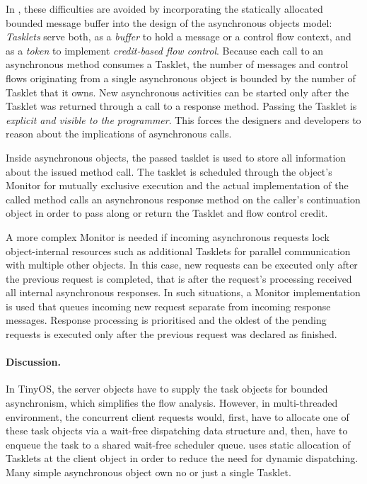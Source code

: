 In \mythos, these difficulties are avoided by incorporating the statically allocated bounded message buffer into the design of the asynchronous objects model:
\hspace{0px}
\emph{Tasklets} serve both, as a \emph{buffer} to hold a message or a control flow context, and as a \emph{token} to implement \emph{credit-based flow control}.
Because each call to an asynchronous method consumes a Tasklet, the number of messages and control flows originating from a single asynchronous object is bounded by the number of Tasklet that it owns. New asynchronous activities can be started only after the Tasklet was returned through a call to a response method.
Passing the Tasklet is \emph{explicit and visible to the programmer}. This forces the designers and developers to reason about the implications of asynchronous calls.

Inside asynchronous objects, the passed tasklet is used to store all information about the issued method call. The tasklet is scheduled through the object's Monitor for mutually exclusive execution and the actual implementation of the called method calls an asynchronous response method on the caller's continuation object in order to pass along or return the Tasklet and flow control credit.

A more complex Monitor is needed if incoming asynchronous requests lock object-internal resources such as additional Tasklets for parallel communication with multiple other objects. In this case, new requests can be executed only after the previous request is completed, that is after the request's processing received all internal asynchronous responses. In such situations, a Monitor implementation is used that queues incoming new request separate from incoming response messages. Response processing is prioritised and the oldest of the pending requests is executed only after the previous request was declared as finished.     

\paragraph{Discussion.}
In TinyOS, the server objects have to supply the task objects for bounded asynchronism, which simplifies the flow analysis. However, in multi-threaded environment, the concurrent client requests would, first, have to allocate one of these task objects via a wait-free dispatching data structure and, then, have to enqueue the task to a shared wait-free scheduler queue. \mythos uses static allocation of Tasklets at the client object in order to reduce the need for dynamic dispatching. Many simple asynchronous object own no or just a single Tasklet.


